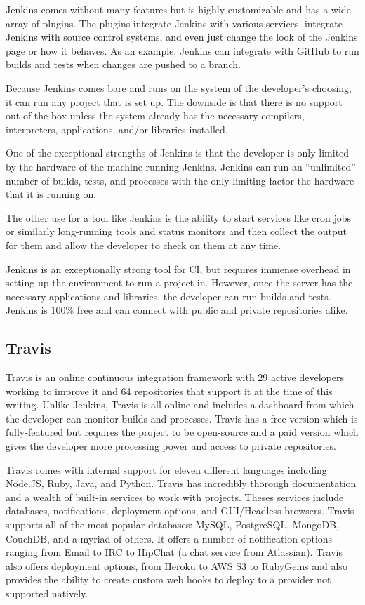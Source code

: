 \documentclass[12pt]{ucthesis}
\begin{document}
Jenkins comes without many features but is highly customizable and has a wide array of plugins. The plugins integrate Jenkins with various services, integrate Jenkins with source control systems, and even just change the look of the Jenkins page or how it behaves. As an example, Jenkins can integrate with GitHub to run builds and tests when changes are pushed to a branch.

Because Jenkins comes bare and runs on the system of the developer's choosing, it can run any project that is set up. The downside is that there is no support out-of-the-box unless the system already has the necessary compilers, interpreters, applications, and/or libraries installed.

One of the exceptional strengths of Jenkins is that the developer is only limited by the hardware of the machine running Jenkins. Jenkins can run an ``unlimited'' number of builds, tests, and processes with the only limiting factor the hardware that it is running on.

The other use for a tool like Jenkins is the ability to start services like cron jobs or similarly long-running tools and status monitors and then collect the output for them and allow the developer to check on them at any time.

Jenkins is an exceptionally strong tool for CI, but requires immense overhead in setting up the environment to run a project in. However, once the server has the necessary applications and libraries, the developer can run builds and tests. Jenkins is 100\% free and can connect with public and private repositories alike.

\subsection{Travis}
Travis\cite{Travis} is an online continuous integration framework with 29 active developers working to improve it and 64 repositories that support it at the time of this writing. Unlike Jenkins, Travis is all online and includes a dashboard from which the developer can monitor builds and processes. Travis has a free version which is fully-featured but requires the project to be open-source and a paid version which gives the developer more processing power and access to private repositories.

Travis comes with internal support for eleven different languages including Node.JS, Ruby, Java, and Python. Travis has incredibly thorough documentation and a wealth of built-in services to work with projects. Theses services include databases, notifications, deployment options, and GUI/Headless browsers. Travis supports all of the most popular databases: MySQL, PostgreSQL, MongoDB, CouchDB, and a myriad of others. It offers a number of notification options ranging from Email to IRC to HipChat (a chat service from Atlassian). Travis also offers deployment options, from Heroku to AWS S3 to RubyGems and also provides the ability to create custom web hooks to deploy to a provider not supported natively.
\end{document}
